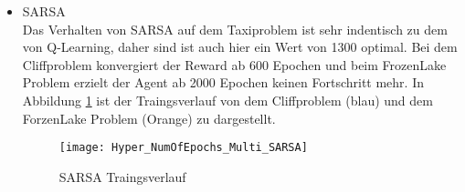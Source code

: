 \begin{itemize}
    \item SARSA\\
    Das Verhalten von SARSA auf dem Taxiproblem ist sehr indentisch zu dem von Q-Learning, daher sind ist auch hier ein Wert von 1300 optimal.
    Bei dem Cliffproblem konvergiert der Reward ab 600 Epochen und beim FrozenLake Problem erzielt der Agent ab 2000 Epochen keinen Fortschritt mehr.
    In Abbildung \ref{fig:SARSA_NumOfEpisods} ist der Traingsverlauf von dem Cliffproblem (blau) und dem ForzenLake Problem (Orange) zu dargestellt.
    \begin{figure}[H]
      \centering
      \texttt{[image: Hyper\_NumOfEpochs\_Multi\_SARSA]}
      \caption{SARSA Traingsverlauf}
      \label{fig:SARSA_NumOfEpisods}
  \end{figure}
\end{itemize}

